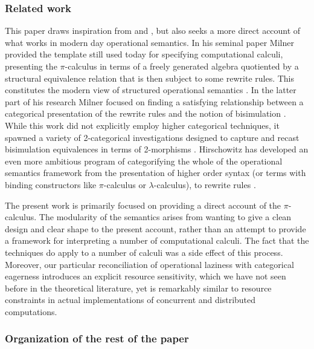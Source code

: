 \documentclass[]{acm_proc_article-sp}
\numberwithin{equation}{subsection}
\newcommand{\pic}{$\pi$-calculus}
\begin{document}
\subsubsection{Related work}


This paper draws inspiration from \cite{DBLP:conf/lics/Seely87} and
\cite{DBLP:journals/tcs/Hilken96}, but also seeks a more direct
account of what works in modern day operational semantics. In his
seminal paper \cite{DBLP:journals/mscs/Milner92} Milner provided the
template still used today for specifying computational calculi,
presenting the {\pic} in terms of a freely generated algebra
quotiented by a structural equivalence relation that is then subject
to some rewrite rules. This constitutes the modern view of structured
operational semantics \cite{Plotkin04theorigins}. In the latter part
of his research Milner focused on finding a satisfying relationship
between a categorical presentation of the rewrite rules and the notion
of bisimulation \cite{DBLP:conf/concur/LeiferM00}. While this work did
not explicitly employ higher categorical techniques, it spawned a
variety of 2-categorical investigations designed to capture and recast
bisimulation equivalences in terms of 2-morphisms
\cite{Sassone02derivingbisimulation}. Hirschowitz has developed an even
more ambitious program of categorifying the whole of the operational
semantics framework from the presentation of higher order syntax (or
terms with binding constructors like {\pic} or $\lambda$-calculus), to
rewrite rules \cite{hirschowitzcc2c}.

The present work is primarily focused on providing a direct account of
the {\pic}. The modularity of the semantics arises from wanting to
give a clean design and clear shape to the present account, rather
than an attempt to provide a framework for interpreting a number of
computational calculi. The fact that the techniques do apply to a
number of calculi was a side effect of this process. Moreover, our
particular reconciliation of operational laziness with categorical
eagerness introduces an explicit resource sensitivity, which we have
not seen before in the theoretical literature, yet is remarkably
similar to resource constraints in actual implementations of
concurrent and distributed computations.

\subsubsection{Organization of the rest of the paper}
\end{document}
